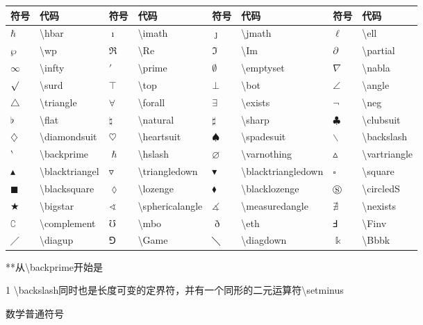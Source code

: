 \documentclass[UTF8,fontset=ubuntu]{ctexbook}
\begin{document}
\begin{threeparttable}
\begin{tabular}{l l l l l l l l}
	\hline
	符号 & 代码 & 符号 & 代码 & 符号 & 代码 & 符号 & 代码\\
	\hline
	$\hbar$ & \textbackslash hbar & $\imath$ & \textbackslash imath & $\jmath$ & \textbackslash jmath & $\ell$ & \textbackslash ell\\
	$\wp$ & \textbackslash wp & $\Re$ & \textbackslash Re & $\Im$ & \textbackslash Im & $\partial$ & \textbackslash partial\\
	$\infty$ & \textbackslash infty & $\prime$ & \textbackslash prime & $\emptyset$ & \textbackslash emptyset & $\nabla$ & \textbackslash nabla\\
	$\surd$ & \textbackslash surd & $\top$ & \textbackslash top & $\bot$ & \textbackslash bot & $\angle$ & \textbackslash angle\\
	$\triangle$ & \textbackslash triangle & $\forall$ & \textbackslash forall & $\exists$ & \textbackslash exists & $\neg$ & \textbackslash neg\\
	$\flat$ & \textbackslash flat & $\natural$ & \textbackslash natural & $\sharp$ & \textbackslash sharp & $\clubsuit$ & \textbackslash clubsuit\\
	$\diamondsuit$ & \textbackslash diamondsuit & $\heartsuit$ & \textbackslash heartsuit & $\spadesuit$ & \textbackslash spadesuit & $\backslash$ & \textbackslash backslash\tnote{1}\\
	$\backprime$ & \textbackslash backprime & $\hslash$ & \textbackslash hslash & $\varnothing$ & \textbackslash varnothing & $\vartriangle$ & \textbackslash vartriangle\\
	$\blacktriangle$ & \textbackslash blacktriangel & $\triangledown$ & \textbackslash triangledown & $\blacktriangledown$ & \textbackslash blacktriangledown & $\square$ & \textbackslash square\\
	$\blacksquare$ & \textbackslash blacksquare & $\lozenge$ & \textbackslash lozenge & $\blacklozenge$ & \textbackslash blacklozenge & $\circledS$ & \textbackslash circledS\\
	$\bigstar$ & \textbackslash bigstar & $\sphericalangle$ & \textbackslash sphericalangle & $\measuredangle$ & \textbackslash measuredangle & $\nexists$ & \textbackslash nexists\\
	$\complement$ & \textbackslash complement & $\mho$ & \textbackslash mbo & $\eth$ & \textbackslash eth & $\Finv$ & \textbackslash Finv\\
	$\diagup$ & \textbackslash diagup & $\Game$ & \textbackslash Game & $\diagdown$ & \textbackslash diagdown & $\Bbbk$ & \textbackslash Bbbk\\
	\hline
\end{tabular}
**从\textbackslash backprime开始是
\begin{tablenotes}
	\item[1] \textbackslash backslash同时也是长度可变的定界符，并有一个同形的二元运算符\textbackslash setminus
\end{tablenotes}
\caption{数学普通符号}
\end{threeparttable}
\end{document}
